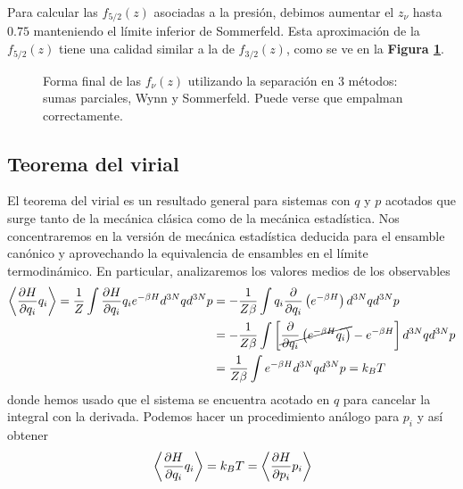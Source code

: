 Para calcular las $f_{5/2}(z)$ asociadas a la presión, debimos aumentar el $z_\nu$ hasta $0.75$ manteniendo el límite inferior de Sommerfeld.
Esta aproximación de la $f_{5/2}(z)$ tiene una calidad similar a la de $f_{3/2}(z)$, como se ve en la \textbf{Figura \ref{fig:f32_f52}}.

\begin{figure}[H]
	\centering
	\hspace{0.05\columnwidth}
	\caption{Forma final de las $f_\nu(z)$ utilizando la separación en 3 métodos: sumas parciales, Wynn y Sommerfeld. Puede verse que empalman correctamente.}
	\label{fig:f32_f52}
\end{figure}



\subsection{Teorema del virial}{\label{ap:teo_virial}}

El teorema del virial es un resultado general para sistemas con $q$ y $p$ acotados que surge tanto de la mecánica clásica como de la mecánica estadística.
Nos concentraremos en la versión de mecánica estadística deducida para el ensamble canónico y aprovechando la equivalencia de ensambles en el límite termodinámico.
En particular, analizaremos los valores medios de los observables
\begin{align*}
\left< \frac{\partial H}{\partial q_i}q_i \right> = \frac{1}{Z}\int \frac{\partial H}{\partial q_i}q_i e^{-\beta H} d^{3N}qd^{3N}p  &= -\frac{1}{Z\beta}\int q_i \frac{\partial}{\partial q_i}\left(e^{-\beta H}\right) d^{3N}qd^{3N}p \\
&= -\frac{1}{Z\beta}\int \left[ \cancel{\frac{\partial}{\partial q_i}\left(e^{-\beta H} q_i\right)} - e^{-\beta H} \right] d^{3N}qd^{3N}p \\
&= \frac{1}{Z\beta}\int  e^{-\beta H} d^{3N}qd^{3N}p = k_B T
\end{align*}
donde hemos usado que el sistema se encuentra acotado en $q$ para cancelar la integral con la derivada.
Podemos hacer un procedimiento análogo para $p_i$ y así obtener
\begin{equation}{\label{eq:teo_virial_T}}
  \left< \frac{\partial H}{\partial q_i}q_i \right> = k_B T = \left< \frac{\partial H}{\partial p_i}p_i \right>
\end{equation}

